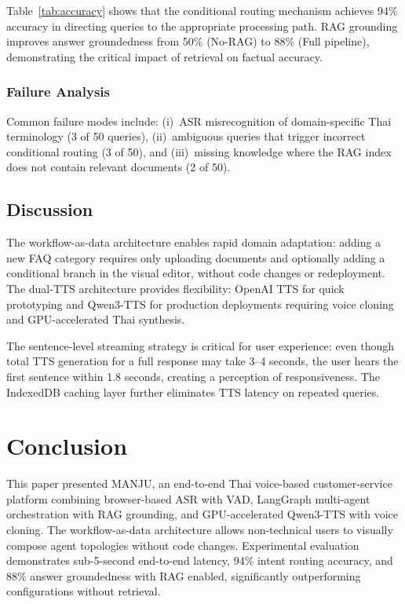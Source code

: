 \documentclass[10pt, a4paper, twocolumn]{article}
\begin{document}
\noindent Table~\ref{tab:accuracy} shows that the conditional routing mechanism achieves 94\% accuracy in directing queries to the appropriate processing path.
RAG grounding improves answer groundedness from 50\% (No-RAG) to 88\% (Full pipeline), demonstrating the critical impact of retrieval on factual accuracy.

\subsubsection{Failure Analysis}
Common failure modes include: (i)~ASR misrecognition of domain-specific Thai terminology (3 of 50 queries), (ii)~ambiguous queries that trigger incorrect conditional routing (3 of 50), and (iii)~missing knowledge where the RAG index does not contain relevant documents (2 of 50).

\subsection{Discussion}

The workflow-as-data architecture enables rapid domain adaptation: adding a new FAQ category requires only uploading documents and optionally adding a conditional branch in the visual editor, without code changes or redeployment.
The dual-TTS architecture provides flexibility: OpenAI TTS for quick prototyping and Qwen3-TTS for production deployments requiring voice cloning and GPU-accelerated Thai synthesis.

The sentence-level streaming strategy is critical for user experience: even though total TTS generation for a full response may take 3--4 seconds, the user hears the first sentence within 1.8 seconds, creating a perception of responsiveness.
The IndexedDB caching layer further eliminates TTS latency on repeated queries.

\section{Conclusion}
\label{sec:conclusion}

This paper presented MANJU, an end-to-end Thai voice-based customer-service platform combining browser-based ASR with VAD, LangGraph multi-agent orchestration with RAG grounding, and GPU-accelerated Qwen3-TTS with voice cloning.
The workflow-as-data architecture allows non-technical users to visually compose agent topologies without code changes.
Experimental evaluation demonstrates sub-5-second end-to-end latency, 94\% intent routing accuracy, and 88\% answer groundedness with RAG enabled, significantly outperforming configurations without retrieval.
\end{document}
